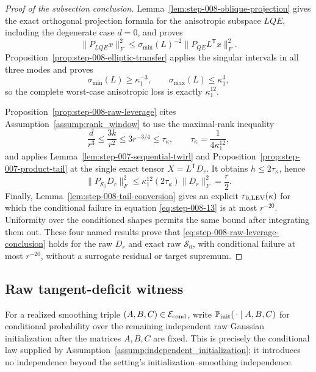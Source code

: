 \begin{proof}[Proof of the subsection conclusion]

Lemma~\ref{lem:step-008-oblique-projection} gives the exact orthogonal
projection formula for the anisotropic subspace \(LQE\), including the
degenerate case \(d=0\), and proves
\[
  \|P_{LQE}x\|_F^2
  \le\sigma_{\min}(L)^{-2}\|P_{QE}L^{\mathsf T}x\|_F^2.
\]
Proposition~\ref{prop:step-008-elliptic-transfer} applies the singular intervals in all three modes and proves
\[
  \sigma_{\min}(L)\ge\kappa_1^{-3},
  \qquad
  \sigma_{\max}(L)\le\kappa_1^3,
\]
so the complete worst-case anisotropic loss is exactly
\(\kappa_1^{12}\).

Proposition~\ref{prop:step-008-raw-leverage} cites
Assumption~\ref{assump:rank_window} to use the maximal-rank inequality
\[
  \frac d{r^3}\le\frac{3k}{r^2}\le3r^{-3/4}
  \le\tau_\kappa,
  \qquad
  \tau_\kappa=\frac1{4\kappa_1^{12}},
\]
and applies Lemma~\ref{lem:step-007-sequential-twirl} and
Proposition~\ref{prop:step-007-product-tail} at the single exact
tensor \(X=L^{\mathsf T}D_r\). It obtains
\(h\le2\tau_\kappa\), hence
\[
  \|P_{\mathscr S_0}D_r\|_F^2
  \le\kappa_1^{12}(2\tau_\kappa)\|D_r\|_F^2
  =\frac r2.
\]
Finally, Lemma~\ref{lem:step-008-tail-conversion} gives an explicit
\(r_{0,\rm LEV}(\kappa)\) for which the conditional failure in equation
\eqref{eq:step-008-13} is at most \(r^{-20}\). Uniformity over the conditioned shapes permits
the same bound after integrating them out. These four named results prove
that \eqref{eq:step-008-raw-leverage-conclusion} holds for the raw \(D_r\) and exact raw
\(\mathscr S_0\), with conditional failure at most \(r^{-20}\), without a
surrogate residual or target supremum.

\end{proof}

\subsection{Raw tangent-deficit witness}\label{app:step-009}

For a realized smoothing triple \((A,B,C)\in\mathcal E_{\rm cond}\), write
\(\mathbb P_{\rm init}(\,\cdot\mid A,B,C)\) for conditional probability over
the remaining independent raw Gaussian initialization after the matrices
\(A,B,C\) are fixed.  This is precisely the conditional law supplied by
Assumption~\ref{assump:independent_initialization}; it introduces no
independence beyond the setting's initialization--smoothing independence.

